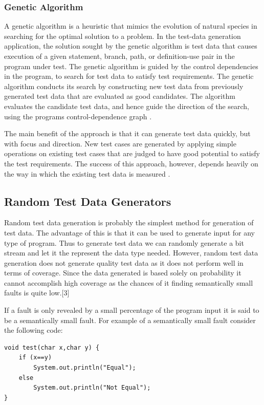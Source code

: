 \subsubsection{Genetic Algorithm}
A genetic algorithm is a heuristic that mimics the evolution of natural species in searching for the optimal solution to a problem. In the test-data generation application, the solution sought by the genetic algorithm is test data that causes execution of a given statement, branch, path, or definition-use pair in the program under test. The genetic algorithm is guided by the control dependencies in the program, to search for test data to satisfy test requirements. The genetic algorithm conducts its search by constructing new test data from previously generated test data that are evaluated as good candidates. The algorithm evaluates the candidate test data, and hence guide the direction of the search, using the programs control-dependence graph \cite{pargas1999test}.

The main benefit of the approach is that it can generate test data quickly, but with focus and direction. New test cases are generated by applying simple operations on existing test cases that are judged to have good potential to satisfy the test requirements. The success of this approach, however, depends heavily on the way in which the existing test data is measured \cite{pargas1999test}.


\subsection{Random Test Data Generators}

Random test data generation is probably the simplest method for generation of test data. The advantage of this is that it can be used to generate input for any type of program. Thus to generate test data we can randomly generate a bit stream and let it the represent the data type needed. However, random test data generation does not generate quality test data as it does not perform well in terms of coverage. Since the data generated is based solely on probability it cannot accomplish high coverage as the chances of it finding semantically small faults is quite low.[3]

If a fault is only revealed by a small percentage of the program input it is said to be a semantically small fault. For example of a semantically small fault consider the following code:
\begin{lstlisting}
void test(char x,char y) {
    if (x==y)
        System.out.println("Equal");
    else
        System.out.println("Not Equal");
}
\end{lstlisting}

